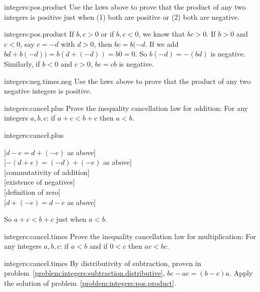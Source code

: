 \begin{problem}{integers:pos.product}
Use the laws above to prove that the product of any two integers is positive just when (1) both are positive or (2) both are negative.
\end{problem}
\begin{answer}{integers:pos.product}
If \(b,c >0\) or if \(b,c < 0\), we know that \(bc>0\).
If \(b>0\) and \(c<0\), say \(c=-d\) with \(d>0\), then \(bc=b(-d\).
If we add \(bd+b(-d))=b(d+(-d))=b0=0\).
So \(b(-d)=-(bd)\) is negative.
Similarly, if \(b<0\) and \(c>0\), \(bc=cb\) is negative.
\end{answer}


\begin{problem}{integers:neg.times.neg}
Use the laws above to prove that the product of any two negative integers is positive.
\end{problem}

\begin{problem}{integers:cancel.plus}
Prove the inequality cancellation law for addition: For any integers \(a, b, c\): if \(a+c<b+c\) then \(a<b\).
\end{problem}
\begin{answer}{integers:cancel.plus}
\begin{twocolumnproof}
[\(d-e=d+(-e)\) as above] \\
[\(-(d+e)=(-d)+(-e)\) as above] \\
[commutativity of addition] \\
[existence of negatives] \\
[definition of zero] \\
[\(d+(-e)=d-e\) as above]
\end{twocolumnproof}
So \(a+c < b+c\) just when \(a<b\).
\end{answer}

\begin{problem}{integers:cancel.times}
Prove the inequality cancellation law for multiplication: For any integers \(a, b, c\): if \(a<b\) and if \(0<c\) then \(ac<bc\).
\end{problem}
\begin{answer}{integers:cancel.times}
By distributivity of subtraction, proven in problem~\vref{problem:integers:subtraction.distributive}, \(bc-ac=(b-c)a\).
Apply the solution of problem~\vref{problem:integers:pos.product}.
\end{answer}




